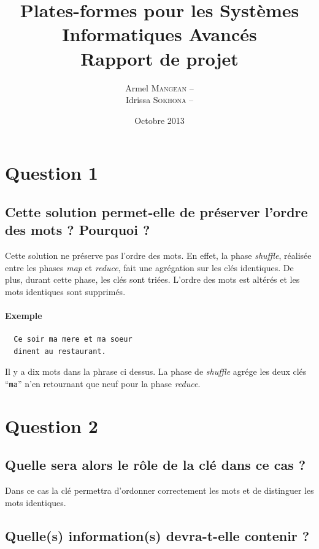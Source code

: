 \documentclass{article}
\title{
  {\bf Plates-formes pour les Systèmes Informatiques Avancés} \\
  Rapport de projet}
\author{
  Armel   \textsc{Mangean} -- \oldstylenums{3262313} \\
  Idrissa \textsc{Sokhona} -- \oldstylenums{3101058}}
\date{Octobre 2013}
\begin{document}
  \maketitle

  \section*{Question 1}
    \subsection*{Cette solution permet-elle de préserver l'ordre des mots ? Pourquoi ?}

      Cette solution ne préserve pas l'ordre des mots. En effet, la phase {\it
        shuffle}, réalisée entre les phases {\it map} et {\it reduce}, fait une
      agrégation sur les clés identiques. De plus, durant cette phase, les clés
      sont triées. L'ordre des mots est altérés et les mots identiques sont
      supprimés.
	
      \paragraph{Exemple}

\begin{verbatim}
  Ce soir ma mere et ma soeur
  dinent au restaurant.
\end{verbatim}

      Il y a dix mots dans la phrase ci dessus. La phase de {\it shuffle} agrége
      les deux clés ``{\tt ma}'' n'en retournant que neuf pour la phase {\it
        reduce}.
        
  \section*{Question 2}
    \subsection*{Quelle sera alors le rôle de la clé dans ce cas ?}

      Dans ce cas la clé permettra d'ordonner correctement les mots et de
      distinguer les mots identiques.

    \subsection*{Quelle(s) information(s) devra-t-elle contenir ?}
\end{document}
